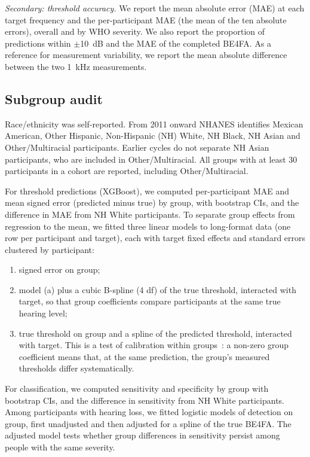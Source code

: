 \documentclass[11pt]{article}
\begin{document}
\emph{Secondary: threshold accuracy.} We report the mean absolute error (MAE) at each target frequency and the per-participant MAE (the mean of the ten absolute errors), overall and by WHO severity. We also report the proportion of predictions within $\pm$10~dB and the MAE of the completed BE4FA. As a reference for measurement variability, we report the mean absolute difference between the two 1~kHz measurements.

\subsection*{Subgroup audit}
Race/ethnicity was self-reported. From 2011 onward NHANES identifies Mexican American, Other Hispanic, Non-Hispanic (NH) White, NH Black, NH Asian and Other/Multiracial participants. Earlier cycles do not separate NH Asian participants, who are included in Other/Multiracial. All groups with at least 30 participants in a cohort are reported, including Other/Multiracial.

For threshold predictions (XGBoost), we computed per-participant MAE and mean signed error (predicted minus true) by group, with bootstrap CIs, and the difference in MAE from NH White participants. To separate group effects from regression to the mean, we fitted three linear models to long-format data (one row per participant and target), each with target fixed effects and standard errors clustered by participant:
\begin{enumerate}
\item[(a)] signed error on group;
\item[(b)] model (a) plus a cubic B-spline (4 df) of the true threshold, interacted with target, so that group coefficients compare participants at the same true hearing level;
\item[(c)] true threshold on group and a spline of the predicted threshold, interacted with target. This is a test of calibration within groups~\cite{kleinberg2017,vancalster2019}: a non-zero group coefficient means that, at the same prediction, the group's measured thresholds differ systematically.
\end{enumerate}
For classification, we computed sensitivity and specificity by group with bootstrap CIs, and the difference in sensitivity from NH White participants. Among participants with hearing loss, we fitted logistic models of detection on group, first unadjusted and then adjusted for a spline of the true BE4FA. The adjusted model tests whether group differences in sensitivity persist among people with the same severity.
\end{document}
